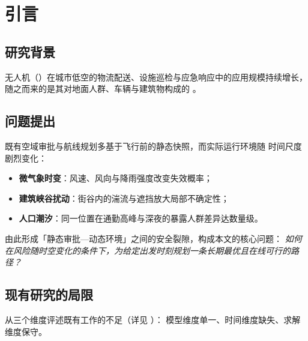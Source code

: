 
\section{引言}
\label{sec:introduction}

\subsection{研究背景}

无人机（\UAV）在城市低空的物流配送、设施巡检与应急响应中的应用规模持续增长，
随之而来的是其对地面人群、车辆与建筑物构成的 \termTPR。


\subsection{问题提出}

既有空域审批与航线规划多基于飞行前的静态快照，而实际运行环境随
时间尺度剧烈变化：

\begin{itemize}
  \item \textbf{微气象时变}：风速、风向与降雨强度改变失效概率；
  \item \textbf{建筑峡谷扰动}：街谷内的湍流与遮挡放大局部不确定性；
  \item \textbf{人口潮汐}：同一位置在通勤高峰与深夜的暴露人群差异达数量级。
\end{itemize}

由此形成「静态审批—动态环境」之间的安全裂隙，构成本文的核心问题：
\textit{如何在风险随时空变化的条件下，为给定出发时刻规划一条长期最优且在线可行的路径？}

\subsection{现有研究的局限}

从三个维度评述既有工作的不足（详见 ）：
模型维度单一、时间维度缺失、求解维度保守。

